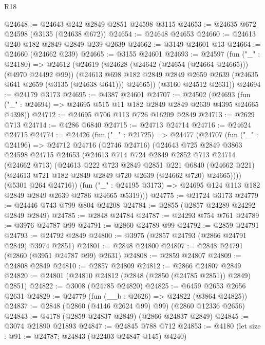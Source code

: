 \begin{lexlean}{R18}
\begin{coremodule}
@24648 := @24643 @242 @2849 @2851 @24598 @3115
@24653 := @24635 @672 @24598 (@3135 (@24638 @672))
@24654 := @24648 @24653
@24660 := @24613 @240 @182 @2849 @2849 @239 @2639
@24662 := @3149 @24601 @13
@24664 := @24660 (@24662 @239)
@24665 := @3155 @24601
@24693 := @24597
    (fun ("_" : @24180) =>
    @24612
      (@24619
        (@24628 (@24642 (@24654 (@24664 @24665))) (@4970 @24492 @99))
        (@24613 @698 @182 @2849 @2849 @2659 @2639 (@24635 @641 @2659 (@3135 (@24638 @641))) @24665))
      (@3160 @24512 @2631))
@24694 := @24179 @3173
@24695 := @4387 @24601
@24707 := @24502
    (@24693 (fun ("_" : @24694) => @24695 @515 @11 @182 @2849 @2849 @2639 @4395 @24665 @4398))
@24712 := @24695 @706 @113 @726 @16209 @2849
@24713 := @2629 @713
@24714 := @4286 @6840
@24715 := @24713 @24714
@24716 := @24624 @24715
@24774 := @24426
    (fun ("_" : @21725) =>
    @24477
      (@24707
        (fun ("_" : @24196) =>
        @24712
          @24716
          (@2746 @24716)
          (@24643
            @725
            @2849
            @3863
            @24598
            @24715
            @24653
            (@24613
              @714
              @724
              @2849
              @2852
              @713
              @24714
              (@24662 @713)
              (@24613
                @222
                @723
                @2849
                @2851
                @221
                @6840
                (@24662 @221)
                (@24613 @721 @182 @2849 @2849 @720 @2639 (@24662 @720) @24665))))
          (@5301 @264 @24716))
        (fun ("_" : @24195 @3173) => @24695 @124 @113 @182 @2849 @2849 @2639 @2786 @24665 @5319)))
@24775 := @21724 @3173
@24779 := @24446 @743 @799 @804 @24208
@24784 := @2855 (@2857 @24289 @24292 @2849 @2849)
@24785 := @2848 @24784
@24787 := @24293 @754 @761
@24789 := @3976 @24787 @99
@24791 := @2860 @24789 @99
@24792 := @2859 @24791
@24793 := @24792 @2849
@24800 := @3975 (@2857 @24793 (@2866 @24791 @2849) @3974 @2851)
@24801 := @2848 @24800
@24807 := @2848 @24791 (@2860 (@3951 @24787 @99) @2631)
@24808 := @2859 @24807
@24809 := @24808 @2849
@24810 := @2857 @24809
@24812 := @2866 @24807 @2849
@24820 := @24801 (@24810 @24812 (@2848 (@2850 (@24785 @2851)) @2849) @2851)
@24822 := @3008 (@24785 @24820)
@24825 := @6459 @2653 @2656 @2631
@24829 := @24779 (fun (__b : @2626) => @24822 (@3864 @24825))
@24837 := @2848 (@2860 (@4146 @2624 @99) @99) (@2860 @12336 @2656)
@24843 := @4178 (@2859 @24837 @2849) (@2866 @24837 @2849)
@24845 := @3074 @21890 @21893
@24847 := @24845 @788 @712
@24853 := @4180 (let size : @91 := @24787; @24843 (@22403 @24847 @145) @4240)

\end{coremodule}
\end{lexlean}
